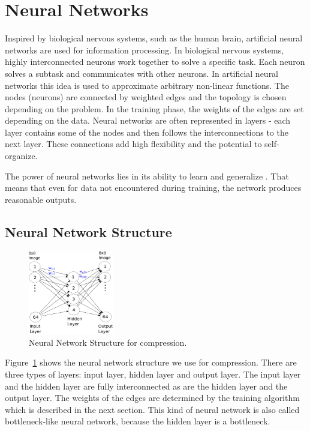 \section{Neural Networks}
\label{sec:nn}

Inspired by biological nervous systems, such as the human brain, artificial neural networks are used for information processing. In biological nervous systems, highly interconnected neurons work together to solve a specific task. Each neuron solves a subtask and communicates with other neurons. In artificial neural networks this idea is used to approximate arbitrary  non-linear functions. The nodes (neurons) are connected by weighted edges and the topology is chosen depending on the problem. In the training phase, the weights of the edges are set depending on the data. Neural networks are often represented in layers - each layer contains some of the nodes and then follows the interconnections to the next layer. These connections add high flexibility and the potential to self-organize.

The power of neural networks lies in its ability to learn and generalize \cite{Haykin:1998:NNC:521706}. That means that even for data not encountered during training, the network produces reasonable outputs. 

\subsection{Neural Network Structure}
\label{sec:neural_net_structure}
\begin{figure}[tbp]
  \centering
  \includegraphics[width=0.33\textwidth]{images/nnStructure}
  \caption{Neural Network Structure for compression.}
  \label{fig:nnStructure}
\end{figure}

Figure~\ref{fig:nnStructure} shows the neural network structure we use for compression. There are three types of layers: input layer, hidden layer and output layer. The input layer and the hidden layer are fully interconnected as are the hidden layer and the output layer. The weights of the edges are determined by the training algorithm which is described in the next section. This kind of neural network is also called bottleneck-like neural network, because the hidden layer is a bottleneck.

